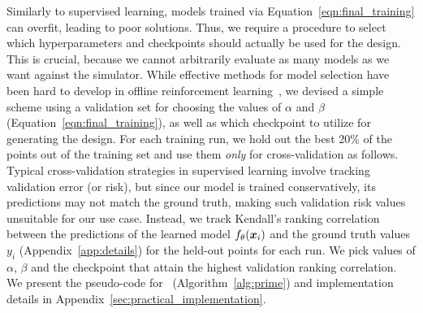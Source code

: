  Similarly to supervised learning, models trained via Equation~\ref{eqn:final_training} can overfit, leading to poor solutions. Thus, we require a procedure to select which hyperparameters and checkpoints should actually be used for the design. This is crucial, because we cannot arbitrarily evaluate as many models as we want against the simulator. While effective methods for model selection have been hard to develop in offline reinforcement learning~\citep{trabucco2021conservative,trabucco2021designbench}, we devised a simple scheme using a validation set for choosing the values of $\alpha$ and $\beta$ (Equation~\ref{eqn:final_training}), as well as which checkpoint to utilize for generating the design. For each training run, we hold out the best 20\% of the points out of the training set and use them \textit{only} for cross-validation as follows. Typical cross-validation strategies in supervised learning involve tracking validation error (or risk), but since our model is trained conservatively, its predictions may not match the ground truth, making such validation risk values unsuitable for our use case. Instead, we track Kendall's ranking correlation between the predictions of the learned model $f_\theta({\boldsymbol{x}}_i)$ and the ground truth values $y_i$ (Appendix~\ref{app:details}) for the held-out points for each run.
We pick values of $\alpha$, $\beta$ and the checkpoint that attain the highest validation ranking correlation.
We present the pseudo-code for \primemethodname\ (Algorithm~\ref{alg:prime}) and implementation details in Appendix~\ref{sec:practical_implementation}.